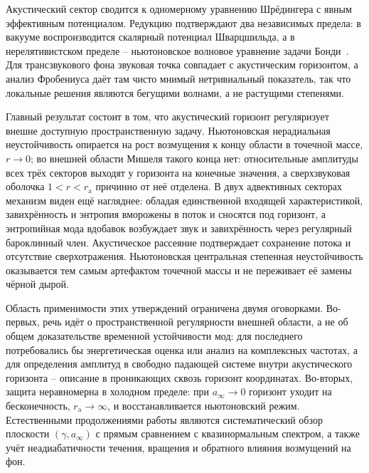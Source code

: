 \documentclass[12pt,a4paper,preprint,nopreprintline]{elsarticle}
\begin{document}
Акустический сектор сводится к одномерному уравнению Шрёдингера с явным эффективным потенциалом. Редукцию подтверждают два независимых предела: в вакууме воспроизводится скалярный потенциал Шварцшильда, а в нерелятивистском пределе -- ньютоновское волновое уравнение задачи Бонди~\cite{KovalenkoIG_EreminMA_SpatialInstabilityOfSphericalAccretion_1998}. Для трансзвукового фона звуковая точка совпадает с акустическим горизонтом, а анализ Фробениуса даёт там чисто мнимый нетривиальный показатель, так что локальные решения являются бегущими волнами, а не растущими степенями.

Главный результат состоит в том, что акустический горизонт регуляризует внешне доступную пространственную задачу. Ньютоновская нерадиальная неустойчивость опирается на рост возмущения к концу области в точечной массе, $r\rightarrow0$; во внешней области Мишеля такого конца нет: относительные амплитуды всех трёх секторов выходят у горизонта на конечные значения, а сверхзвуковая оболочка $1<r<r_{\mathrm{a}}$ причинно от неё отделена. В двух адвективных секторах механизм виден ещё нагляднее: обладая единственной входящей характеристикой, завихрённость и энтропия вморожены в поток и сносятся под горизонт, а энтропийная мода вдобавок возбуждает звук и завихрённость через регулярный бароклинный член. Акустическое рассеяние подтверждает сохранение потока и отсутствие сверхотражения. Ньютоновская центральная степенная неустойчивость оказывается тем самым артефактом точечной массы и не переживает её замены чёрной дырой.

Область применимости этих утверждений ограничена двумя оговорками. Во-первых, речь идёт о пространственной регулярности внешней области, а не об общем доказательстве временной устойчивости мод: для последнего потребовались бы энергетическая оценка или анализ на комплексных частотах, а для определения амплитуд в свободно падающей системе внутри акустического горизонта -- описание в проникающих сквозь горизонт координатах. Во-вторых, защита неравномерна в холодном пределе: при $a_{\infty}\rightarrow0$ горизонт уходит на бесконечность, $r_{\mathrm{a}}\rightarrow\infty$, и восстанавливается ньютоновский режим. Естественными продолжениями работы являются систематический обзор плоскости $(\gamma,a_{\infty})$ с прямым сравнением с квазинормальным спектром, а также учёт неадиабатичности течения, вращения и обратного влияния возмущений на фон.

\clearpage



\end{document}
